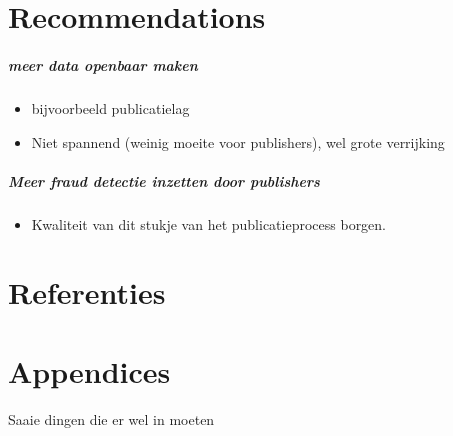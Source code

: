 \documentclass{ou-report}
\newcommand{\outline}[1]{{\color{blue} #1}}
\begin{document}
\chapter{Recommendations}
\label{chp:recommendations}
\outline {
\paragraph{meer data openbaar maken}
\begin{itemize}
    \item bijvoorbeeld publicatielag
    \item Niet spannend (weinig moeite voor publishers), wel grote verrijking
\end{itemize}
\paragraph{Meer fraud detectie inzetten door publishers}
\begin{itemize}
    \item Kwaliteit van dit stukje van het publicatieprocess borgen.
\end{itemize}
}

\chapter{Referenties}

\chapter{Appendices}
\outline{
Saaie dingen die er wel in moeten
}


\backmatter
{}




\appendix
%  
%  
%  
\end{document}
